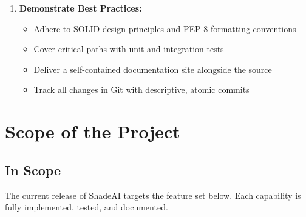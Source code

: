 \begin{enumerate}
    \item \textbf{Demonstrate Best Practices:}
    \begin{itemize}
        \item Adhere to SOLID design principles and PEP-8 formatting conventions
        \item Cover critical paths with unit and integration tests
        \item Deliver a self-contained documentation site alongside the source
        \item Track all changes in Git with descriptive, atomic commits
    \end{itemize}
\end{enumerate}

\section{Scope of the Project}

\subsection{In Scope}

The current release of ShadeAI targets the feature set below. Each capability is fully implemented, tested, and documented.

